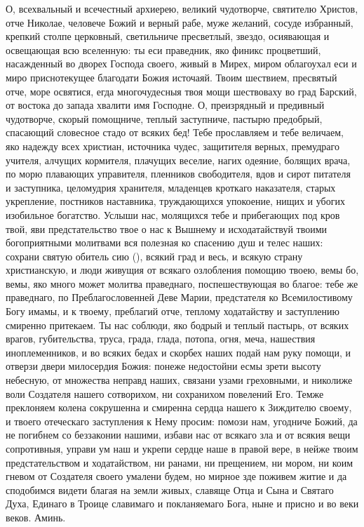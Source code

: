 \begin{mymulticols}
О, всехвальный и всечестный архиерею, великий чудотворче, святителю Христов, отче Николае, человече Божий и верный рабе, муже желаний, сосуде избранный, крепкий столпе церковный, светильниче пресветлый, звездо, осиявающая и освещающая всю вселенную: ты еси праведник, яко финикс процветший, насажденный во дворех Господа своего, живый в Мирех, миром облагоухал еси и миро приснотекущее благодати Божия источаяй. Твоим шествием, пресвятый отче, море освятися, егда многочудесныя твоя мощи шествоваху во град Барский, от востока до запада хвалити имя Господне. О, преизрядный и предивный чудотворче, скорый помощниче, теплый заступниче, пастырю предобрый, спасающий словесное стадо от всяких бед! Тебе прославляем и тебе величаем, яко надежду всех христиан, источника чудес, защитителя верных, премудраго учителя, алчущих кормителя, плачущих веселие, нагих одеяние, болящих врача, по морю плавающих управителя, пленников свободителя, вдов и сирот питателя и заступника, целомудрия хранителя, младенцев кроткаго наказателя, старых укрепление, постников наставника, труждающихся упокоение, нищих и убогих изобильное богатство. Услыши нас, молящихся тебе и прибегающих под кров твой, яви предстательство твое о нас к Вышнему и исходатайствуй твоими богоприятными молитвами вся полезная ко спасению душ и телес наших: сохрани святую обитель сию (), всякий град и весь, и всякую страну христианскую, и люди живущия от всякаго озлобления помощию твоею, вемы бо, вемы, яко много может молитва праведнаго, поспешествующая во благое: тебе же праведнаго, по Преблагословенней Деве Марии, предстателя ко Всемилостивому Богу имамы, и к твоему, преблагий отче, теплому ходатайству и заступлению смиренно притекаем. Ты нас соблюди, яко бодрый и теплый пастырь, от всяких врагов, губительства, труса, града, глада, потопа, огня, меча, нашествия иноплеменников, и во всяких бедах и скорбех наших подай нам руку помощи, и отверзи двери милосердия Божия: понеже недостойни есмы зрети высоту небесную, от множества неправд наших, связани узами греховными, и николиже воли Создателя нашего сотворихом, ни сохранихом повелений Его. Темже преклоняем колена сокрушенна и смиренна сердца нашего к Зиждителю своему, и твоего отеческаго заступления к Нему  просим: помози нам, угодниче Божий, да не погибнем со беззаконии нашими, избави нас от всякаго зла и от всякия вещи сопротивныя, управи ум наш и укрепи сердце наше в правой вере, в нейже твоим предстательством и ходатайством, ни ранами, ни прещением, ни мором, ни коим гневом от Создателя своего умалени будем, но мирное зде поживем житие и да сподобимся видети благая на земли живых, славяще Отца и Сына и Святаго Духа, Единаго в Троице славимаго и покланяемаго Бога, ныне и присно и во веки веков. Аминь.

\end{mymulticols}

